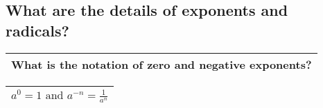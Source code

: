 \subsection{What are the details of exponents and radicals?}

\begin{small}
    \begin{tabularx}{1\textwidth}{
            p{}
        }
        \toprule
        What is the notation of zero and negative exponents?
        \\
        \bottomrule

    \end{tabularx}
\end{small}

\begin{small}
    \begin{tabularx}{1\textwidth}{
            p{}
        }
        \toprule
        $ a^{0} = 1 \text{ and } a^{-n}  = \frac{1}{a^{n}} $
        \\
        \bottomrule
    \end{tabularx}
\end{small}

